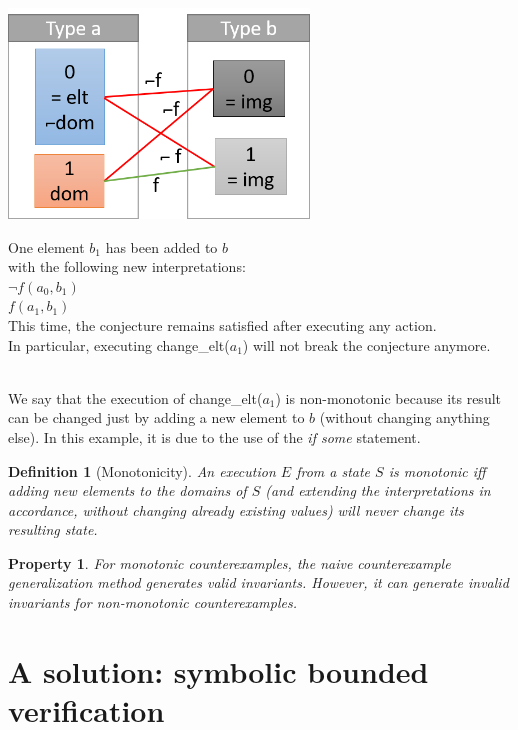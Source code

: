 \documentclass[11pt,a4paper,oldfontcommands]{memoir}
\newtheorem*{definition}{Definition}
\newtheorem*{property}{Property}
\begin{document}
    \begin{minipage}{0.45\textwidth}
        \includegraphics[width=8cm]{NonMonotonicExValid}
    \end{minipage} \hfill
    \begin{minipage}{0.45\textwidth}
        One element \(b_1\) has been added to \(b\)\\
        with the following new interpretations:\\
        \(\neg f(a_0,b_1)\)\\
        \(f(a_1,b_1)\)\\
        This time, the conjecture remains satisfied after executing any action.\\
        In particular, executing change_elt(\(a_1\)) will not break the conjecture anymore.
    \end{minipage}\\

    We say that the execution of change_elt(\(a_1\)) is non-monotonic because its result can be changed just by adding a new element
    to \(b\) (without changing anything else). In this example, it is due to the use of the \textit{if some} statement.

    \begin{definition}[Monotonicity]
        An execution \(E\) from a state \(S\) is monotonic iff adding new elements to the domains of \(S\)
        (and extending the interpretations in accordance, without changing already existing values)
        will never change its resulting state.
    \end{definition}

    \begin{property}
        For monotonic counterexamples, the naive counterexample generalization method generates valid invariants.
        However, it can generate invalid invariants for non-monotonic counterexamples.
    \end{property}

    \section{A solution: symbolic bounded verification}
\end{document}

